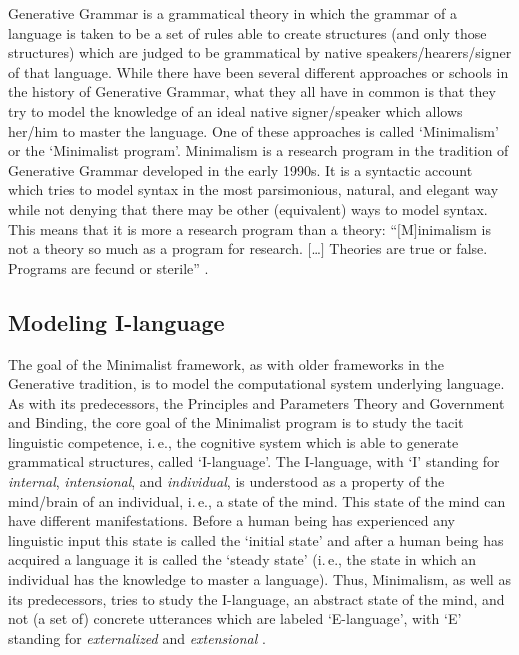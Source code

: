 Generative Grammar is a grammatical theory in which the grammar of a language is taken to be a set of rules able to create structures (and only those structures) which are judged to be grammatical by native speakers/hearers/signer of that language. While there have been several different approaches or schools in the history of Generative Grammar, what they all have in common is that they try to model the knowledge of an ideal native signer/speaker which allows her/him to master the language. One of these approaches is called `Minimalism' or the `Minimalist program'. Minimalism is a research program in the tradition of Generative Grammar developed in the early 1990s. It is a syntactic account which tries to model syntax in the most parsimonious, natural, and elegant way while not denying that there may be other (equivalent) ways to model syntax. This means that it is more a research program than a theory: ``$[$M$]$inimalism is not a theory so much as a program for research. $[$\dots $]$ Theories are true or false. Programs are fecund or sterile'' \citep[6]{hornstein2005understanding}.

\subsection{Modeling I-language}
The goal of the Minimalist framework, as with older frameworks in the Generative tradition, is to model the computational system underlying language. As with its predecessors, the Principles and Parameters Theory and Government and Binding, the core goal of the Minimalist program is to study the tacit linguistic competence, i.\,e., the cognitive system which is able to generate grammatical structures, called `I-language'. The I-language, with `I' standing for \textit{internal}, \textit{intensional}, and \textit{individual}, is understood as a property of the mind/brain of an individual, i.\,e., a state of the mind. This state of the mind can have different manifestations. Before a human being has experienced any linguistic input this state is called the `initial state' and after a human being has acquired a language it is called the `steady state' (i.\,e., the state in which an individual has the knowledge to master a language). Thus, Minimalism, as well as its predecessors, tries to study the I-language, an abstract state of the mind, and not (a set of) concrete utterances which are labeled `E-language', with `E' standing for \textit{externalized} and \textit{extensional} \citep{chomsky1986barr}.

